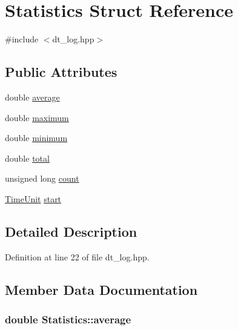 \hypertarget{struct_statistics}{
\section{Statistics Struct Reference}
\label{struct_statistics}
}


{\ttfamily \#include $<$dt\_\-log.hpp$>$}\subsection*{Public Attributes}
\begin{DoxyCompactItemize}
\item 
double \hyperlink{struct_statistics_a6444f03722e2b4e3b7cf885f9224e9ce}{average}
\item 
double \hyperlink{struct_statistics_aa579bead66071a595a709b6049d17be6}{maximum}
\item 
double \hyperlink{struct_statistics_a8474c5e63820e090f6fb4805c2c50d2b}{minimum}
\item 
double \hyperlink{struct_statistics_af3abef91cebaeede5182f4e0b8d0a95c}{total}
\item 
unsigned long \hyperlink{struct_statistics_a91bc9e0f5355e1d2fcd6a308149e2ace}{count}
\item 
\hyperlink{basic_8hpp_ac0ec6c8e4757751eaaa618bbf62ab6c9}{TimeUnit} \hyperlink{struct_statistics_a53f28ccde1c94e356405afffe1e10ed6}{start}
\end{DoxyCompactItemize}


\subsection{Detailed Description}


Definition at line 22 of file dt\_\-log.hpp.

\subsection{Member Data Documentation}
\hypertarget{struct_statistics_a6444f03722e2b4e3b7cf885f9224e9ce}{
\subsubsection[{average}]{\setlength{\rightskip}{0pt plus 5cm}double {\bf Statistics::average}}}
\label{struct_statistics_a6444f03722e2b4e3b7cf885f9224e9ce}


